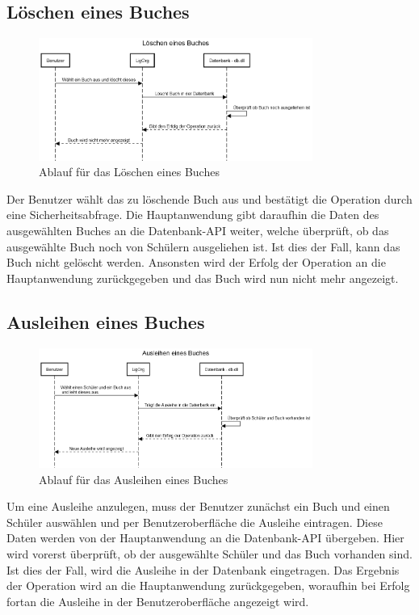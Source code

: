 \subsection{Löschen eines Buches}
\begin{figure}[H]
	\centering
	\includegraphics[width=0.80\textwidth]{figures/laufzeit/removebook.png}
	\caption{Ablauf für das Löschen eines Buches}
	\label{fig:removebook}
\end{figure}
Der Benutzer wählt das zu löschende Buch aus und bestätigt die Operation durch eine Sicherheitsabfrage. Die Hauptanwendung gibt daraufhin die Daten des ausgewählten Buches an die Datenbank-API weiter, welche überprüft, ob das ausgewählte Buch noch von Schülern ausgeliehen ist. Ist dies der Fall, kann das Buch nicht gelöscht werden. Ansonsten wird der Erfolg der Operation an die Hauptanwendung zurückgegeben und das Buch wird nun nicht mehr angezeigt.

\subsection{Ausleihen eines Buches}
\begin{figure}[H]
	\centering
	\includegraphics[width=0.80\textwidth]{figures/laufzeit/lending.png}
	\caption{Ablauf für das Ausleihen eines Buches}
	\label{fig:lending}
\end{figure}
Um eine Ausleihe anzulegen, muss der Benutzer zunächst ein Buch und einen Schüler auswählen und per Benutzeroberfläche die Ausleihe eintragen. Diese Daten werden von der Hauptanwendung an die Datenbank-API übergeben. Hier wird vorerst überprüft, ob der ausgewählte Schüler und das Buch vorhanden sind. Ist dies der Fall, wird die Ausleihe in der Datenbank eingetragen. Das Ergebnis der Operation wird an die Hauptanwendung zurückgegeben, woraufhin bei Erfolg fortan die Ausleihe in der Benutzeroberfläche angezeigt wird.


